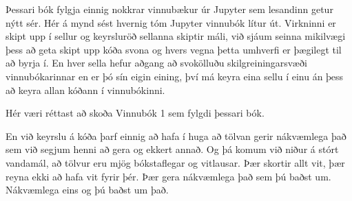Þessari bók fylgja einnig nokkrar vinnubækur úr Jupyter sem lesandinn getur nýtt sér. 
Hér á mynd  sést hvernig tóm Jupyter vinnubók lítur út. 
Virkninni er skipt upp í sellur og keyrsluröð sellanna skiptir máli, við sjáum seinna mikilvægi þess að geta skipt upp kóða svona og hvers vegna þetta umhverfi er þægilegt til að byrja í. 
En hver sella hefur aðgang að svokölluðu skilgreiningarsvæði vinnubókarinnar en er þó sín eigin eining, því má keyra eina sellu í einu án þess að keyra allan kóðann í vinnubókinni.

Hér væri réttast að skoða Vinnubók 1 sem fylgdi þessari bók. 

En við keyrslu á kóða þarf einnig að hafa í huga að tölvan gerir nákvæmlega það sem við segjum henni að gera og ekkert annað.
Og þá komum við niður á stórt vandamál, að tölvur eru mjög bókstaflegar og vitlausar.
Þær skortir allt vit, þær reyna ekki að hafa vit fyrir þér. 
Þær gera nákvæmlega það sem þú baðst um.
Nákvæmlega eins og þú baðst um það.

